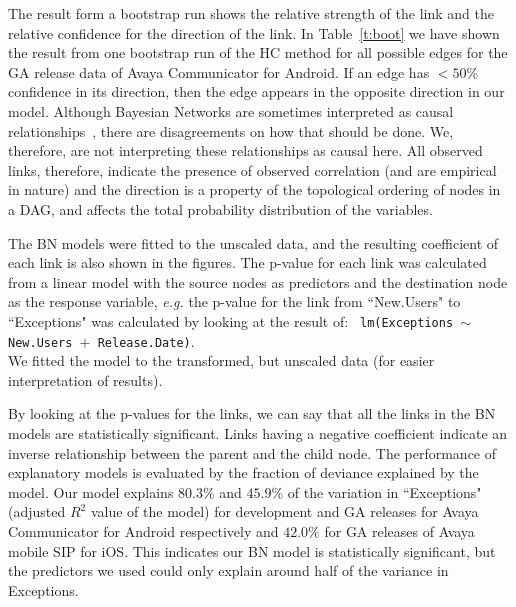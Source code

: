 \documentclass[smallcondensed]{svjour3}     %
\begin{document}
The result form a bootstrap run shows the relative strength of the
link and the relative confidence for the direction of the link. 
In Table~\ref{t:boot} we have shown the result from one bootstrap run of the HC method for all possible edges for the GA release data of Avaya Communicator for Android. If an edge has $<50\%$ confidence in its direction, then the edge appears in the opposite direction in our model.
Although Bayesian Networks are sometimes interpreted as causal relationships~\cite{pearl2011bayesian}, there are disagreements on how that should be done.
We, therefore, are not interpreting these relationships as causal here. All observed links, therefore, indicate the presence of observed correlation (and are empirical in nature) and the direction is a property of the topological ordering of nodes in a DAG, and affects the total probability distribution of the variables.

The BN models were fitted to
the unscaled data, and the resulting coefficient of each link is also shown
in the figures. The p-value for each link was calculated from a
linear model with the source nodes as predictors and the destination
node as the response variable, \emph{e.g.} the p-value for the link from
``New.Users" to ``Exceptions" was calculated by looking at the
result of:  \texttt{  lm(Exceptions $\sim$ New.Users $+$ Release.Date)}. \\
We fitted the model to the transformed, but unscaled data (for easier interpretation of results). 

By looking at the p-values for the links, we can say that all the links in the BN models
are statistically significant. 
Links having a negative coefficient indicate an inverse relationship between the parent 
and the child node. The performance of explanatory models is evaluated by the fraction
of deviance explained by the model. Our model explains $80.3\%$ and $45.9\%$ of the
variation in ``Exceptions" (adjusted $R^2$ value of the model) for development and GA releases for Avaya Communicator for Android respectively and $42.0\%$ for GA releases of Avaya mobile SIP for iOS. This indicates our BN model is statistically significant, but the predictors we used could only explain around half of the variance in Exceptions.


\vspace{-10pt}
\end{document}
